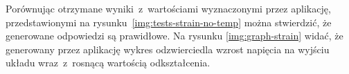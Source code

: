 Porównując otrzymane wyniki~z~wartościami wyznaczonymi przez aplikację, przedstawionymi na
rysunku~\ref{img:tests-strain-no-temp} można stwierdzić, że generowane odpowiedzi są prawidłowe.
Na rysunku \ref{img:graph-strain} widać, że generowany przez aplikację wykres odzwierciedla wzrost
napięcia na wyjściu układu wraz~z~rosnącą wartością odkształcenia.


